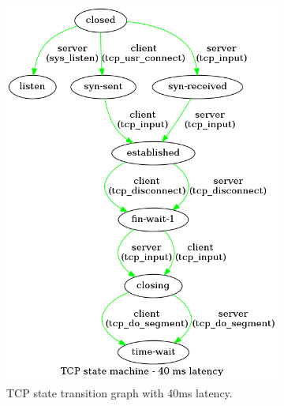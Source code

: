 \documentclass[a4paper,10pt]{article}
\begin{document}
\begin{figure}[]
\begin{subfigure}{.25\textwidth}
   \includegraphics[width=\textwidth]{images/TCP_state_machine_40_ms.png}
    \caption{TCP state transition graph with 40ms latency.}
    \label{fig:40ms_latency}
\end{subfigure}
\qquad
\begin{subfigure}{.25\textwidth}
   \centering

\end{subfigure}
\end{figure}
\end{document}
